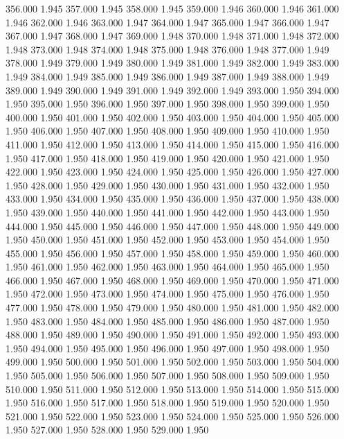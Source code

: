 356.000 1.945 
357.000 1.945 
358.000 1.945 
359.000 1.946 
360.000 1.946 
361.000 1.946 
362.000 1.946 
363.000 1.947 
364.000 1.947 
365.000 1.947 
366.000 1.947 
367.000 1.947 
368.000 1.947 
369.000 1.948 
370.000 1.948 
371.000 1.948 
372.000 1.948 
373.000 1.948 
374.000 1.948 
375.000 1.948 
376.000 1.948 
377.000 1.949 
378.000 1.949 
379.000 1.949 
380.000 1.949 
381.000 1.949 
382.000 1.949 
383.000 1.949 
384.000 1.949 
385.000 1.949 
386.000 1.949 
387.000 1.949 
388.000 1.949 
389.000 1.949 
390.000 1.949 
391.000 1.949 
392.000 1.949 
393.000 1.950 
394.000 1.950 
395.000 1.950 
396.000 1.950 
397.000 1.950 
398.000 1.950 
399.000 1.950 
400.000 1.950 
401.000 1.950 
402.000 1.950 
403.000 1.950 
404.000 1.950 
405.000 1.950 
406.000 1.950 
407.000 1.950 
408.000 1.950 
409.000 1.950 
410.000 1.950 
411.000 1.950 
412.000 1.950 
413.000 1.950 
414.000 1.950 
415.000 1.950 
416.000 1.950 
417.000 1.950 
418.000 1.950 
419.000 1.950 
420.000 1.950 
421.000 1.950 
422.000 1.950 
423.000 1.950 
424.000 1.950 
425.000 1.950 
426.000 1.950 
427.000 1.950 
428.000 1.950 
429.000 1.950 
430.000 1.950 
431.000 1.950 
432.000 1.950 
433.000 1.950 
434.000 1.950 
435.000 1.950 
436.000 1.950 
437.000 1.950 
438.000 1.950 
439.000 1.950 
440.000 1.950 
441.000 1.950 
442.000 1.950 
443.000 1.950 
444.000 1.950 
445.000 1.950 
446.000 1.950 
447.000 1.950 
448.000 1.950 
449.000 1.950 
450.000 1.950 
451.000 1.950 
452.000 1.950 
453.000 1.950 
454.000 1.950 
455.000 1.950 
456.000 1.950 
457.000 1.950 
458.000 1.950 
459.000 1.950 
460.000 1.950 
461.000 1.950 
462.000 1.950 
463.000 1.950 
464.000 1.950 
465.000 1.950 
466.000 1.950 
467.000 1.950 
468.000 1.950 
469.000 1.950 
470.000 1.950 
471.000 1.950 
472.000 1.950 
473.000 1.950 
474.000 1.950 
475.000 1.950 
476.000 1.950 
477.000 1.950 
478.000 1.950 
479.000 1.950 
480.000 1.950 
481.000 1.950 
482.000 1.950 
483.000 1.950 
484.000 1.950 
485.000 1.950 
486.000 1.950 
487.000 1.950 
488.000 1.950 
489.000 1.950 
490.000 1.950 
491.000 1.950 
492.000 1.950 
493.000 1.950 
494.000 1.950 
495.000 1.950 
496.000 1.950 
497.000 1.950 
498.000 1.950 
499.000 1.950 
500.000 1.950 
501.000 1.950 
502.000 1.950 
503.000 1.950 
504.000 1.950 
505.000 1.950 
506.000 1.950 
507.000 1.950 
508.000 1.950 
509.000 1.950 
510.000 1.950 
511.000 1.950 
512.000 1.950 
513.000 1.950 
514.000 1.950 
515.000 1.950 
516.000 1.950 
517.000 1.950 
518.000 1.950 
519.000 1.950 
520.000 1.950 
521.000 1.950 
522.000 1.950 
523.000 1.950 
524.000 1.950 
525.000 1.950 
526.000 1.950 
527.000 1.950 
528.000 1.950 
529.000 1.950 
